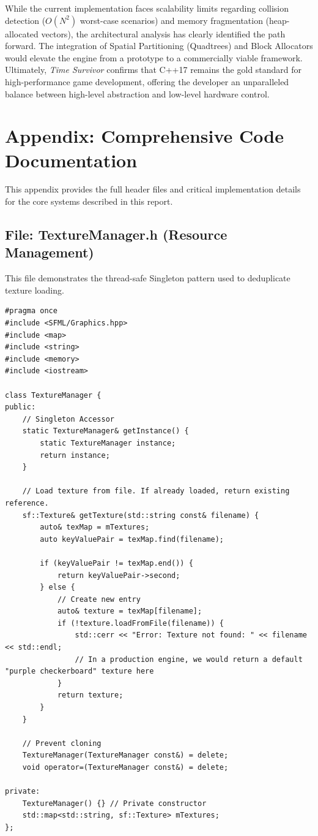 \documentclass[10pt, a4paper]{article}
\begin{document}
While the current implementation faces scalability limits regarding collision detection ($O(N^2)$ worst-case scenarios) and memory fragmentation (heap-allocated vectors), the architectural analysis has clearly identified the path forward. The integration of Spatial Partitioning (Quadtrees) and Block Allocators would elevate the engine from a prototype to a commercially viable framework. Ultimately, \textit{Time Survivor} confirms that C++17 remains the gold standard for high-performance game development, offering the developer an unparalleled balance between high-level abstraction and low-level hardware control.

\newpage
\appendix
\section{Appendix: Comprehensive Code Documentation}

This appendix provides the full header files and critical implementation details for the core systems described in this report.

\subsection{File: TextureManager.h (Resource Management)}
This file demonstrates the thread-safe Singleton pattern used to deduplicate texture loading.

\begin{lstlisting}[style=cppstyle, caption={TextureManager.h}]
#pragma once
#include <SFML/Graphics.hpp>
#include <map>
#include <string>
#include <memory>
#include <iostream>

class TextureManager {
public:
    // Singleton Accessor
    static TextureManager& getInstance() {
        static TextureManager instance;
        return instance;
    }

    // Load texture from file. If already loaded, return existing reference.
    sf::Texture& getTexture(std::string const& filename) {
        auto& texMap = mTextures;
        auto keyValuePair = texMap.find(filename);

        if (keyValuePair != texMap.end()) {
            return keyValuePair->second;
        } else {
            // Create new entry
            auto& texture = texMap[filename];
            if (!texture.loadFromFile(filename)) {
                std::cerr << "Error: Texture not found: " << filename << std::endl;
                // In a production engine, we would return a default "purple checkerboard" texture here
            }
            return texture;
        }
    }

    // Prevent cloning
    TextureManager(TextureManager const&) = delete;
    void operator=(TextureManager const&) = delete;

private:
    TextureManager() {} // Private constructor
    std::map<std::string, sf::Texture> mTextures;
};
\end{lstlisting}
\end{document}
